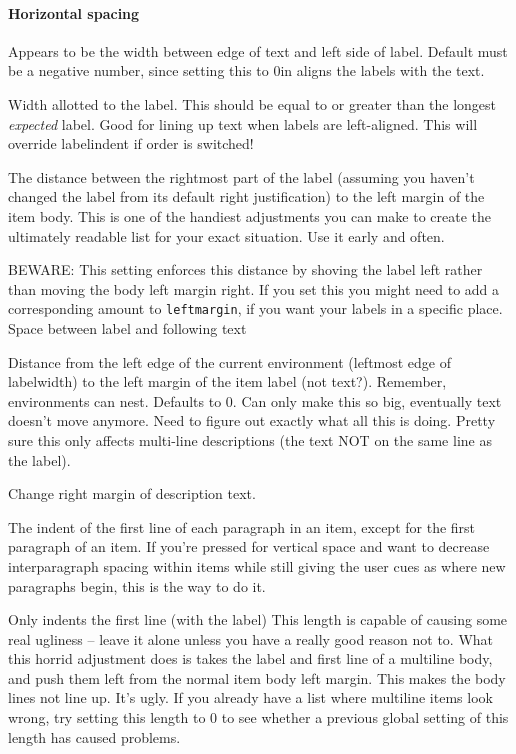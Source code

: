 \documentclass{article}
\begin{document}
\paragraph{Horizontal spacing}
\begin{description}[labelindent=2cm, leftmargin=\labelindent,
        ]
    \item [labelindent] Appears to be the width between edge of text
        and left side of label. Default must be a negative number, since
        setting this to 0in aligns the labels with the text.
    \item [labelwidth]
        Width allotted to the label. This should be equal to or greater than
        the longest \emph{expected} label. Good for lining up text when labels
        are left-aligned. This will override labelindent if order is switched!
    \item [labelsep]
        The distance between the rightmost part of the label (assuming
        you haven't changed the label from its default right
        justification) to the left margin of the item body. This is
        one of the handiest adjustments you can make to create the
        ultimately readable list for your exact situation. Use it
        early and often.

        BEWARE\@: This setting enforces this distance by shoving the
        label left rather than moving the body left margin right. If
        you set this you might need to add a corresponding amount to
        \texttt{leftmargin}, if you want your labels in a specific place.
        Space between label and following text
    \item [leftmargin] Distance from the left edge of the current
        environment (leftmost edge of labelwidth) to the left margin of the
        item label (not text?). Remember, environments can nest. Defaults to 0.
        Can only make this so big, eventually text doesn't move anymore.
        Need to figure out exactly what all this is doing.
        Pretty sure this only affects multi-line descriptions
        (the text NOT on the same line as the label).
    \item [rightmargin] Change right margin of description text.
    \item [listparindent] The indent of the first line of each
        paragraph in an item, except for the first paragraph of an
        item. If you're pressed for vertical space and want to
        decrease interparagraph spacing within items while still
        giving the user cues as where new paragraphs begin, this is
        the way to do it.
    \item [itemindent] Only indents the first line (with the label)
        This length is capable of causing some real ugliness -- leave
        it alone unless you have a really good reason not to. What
        this horrid adjustment does is takes the label and first line
        of a multiline body, and push them left from the normal item
        body left margin. This makes the body lines not line up. It's
        ugly. If you already have a list where multiline items look
        wrong, try setting this length to 0 to see whether a previous
        global setting of this length has caused problems.


\end{description}
\end{document}

